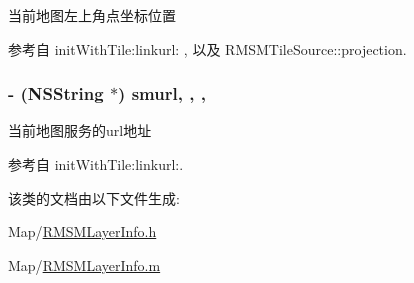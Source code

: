 当前地图左上角点坐标位置 



参考自 init\-With\-Tile\-:linkurl\-: , 以及 R\-M\-S\-M\-Tile\-Source\-::projection.

\hypertarget{interface_r_m_s_m_layer_info_ac4aefcf958b2ba03724dc84c1c667126}{
\subsubsection[{smurl}]{\setlength{\rightskip}{0pt plus 5cm}-\/ (N\-S\-String $\ast$) smurl\hspace{0.3cm}{\ttfamily [read]}, {\ttfamily [write]}, {\ttfamily [atomic]}, {\ttfamily [assign]}}}\label{interface_r_m_s_m_layer_info_ac4aefcf958b2ba03724dc84c1c667126}


当前地图服务的url地址 



参考自 init\-With\-Tile\-:linkurl\-:.



该类的文档由以下文件生成\-:\begin{DoxyCompactItemize}
\item 
Map/\hyperlink{_r_m_s_m_layer_info_8h}{R\-M\-S\-M\-Layer\-Info.\-h}\item 
Map/\hyperlink{_r_m_s_m_layer_info_8m}{R\-M\-S\-M\-Layer\-Info.\-m}\end{DoxyCompactItemize}
